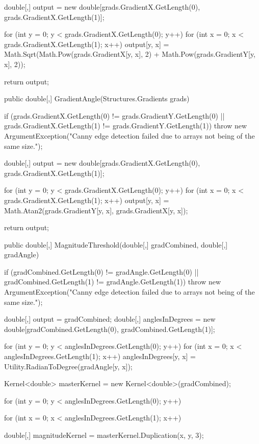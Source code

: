 \begin{flushleft}
\begin{cscode}
{{        double[,] output = new double[grads.GradientX.GetLength(0), grads.GradientX.GetLength(1)];

        for (int y = 0; y < grads.GradientX.GetLength(0); y++)
        {
            for (int x = 0; x < grads.GradientX.GetLength(1); x++)
            {
                output[y, x] = Math.Sqrt(Math.Pow(grads.GradientX[y, x], 2) + Math.Pow(grads.GradientY[y, x], 2));
            }
        }

        return output;
    }

    public double[,] GradientAngle(Structures.Gradients grads)
    {
        if (grads.GradientX.GetLength(0) != grads.GradientY.GetLength(0) || grads.GradientX.GetLength(1) != grads.GradientY.GetLength(1))
            throw new ArgumentException("Canny edge detection failed due to arrays not being of the same size.");

        double[,] output = new double[grads.GradientX.GetLength(0), grads.GradientX.GetLength(1)];

        for (int y = 0; y < grads.GradientX.GetLength(0); y++)
        {
            for (int x = 0; x < grads.GradientX.GetLength(1); x++)
            {
                output[y, x] = Math.Atan2(grads.GradientY[y, x], grads.GradientX[y, x]);
            }
        }

        return output;
    }

    public double[,] MagnitudeThreshold(double[,] gradCombined, double[,] gradAngle)
    {
        if (gradCombined.GetLength(0) != gradAngle.GetLength(0) || gradCombined.GetLength(1) != gradAngle.GetLength(1))
            throw new ArgumentException("Canny edge detection failed due to arrays not being of the same size.");

        double[,] output = gradCombined;
        double[,] anglesInDegrees = new double[gradCombined.GetLength(0), gradCombined.GetLength(1)];

        for (int y = 0; y < anglesInDegrees.GetLength(0); y++)
        {
            for (int x = 0; x < anglesInDegrees.GetLength(1); x++)
            {
                anglesInDegrees[y, x] = Utility.RadianToDegree(gradAngle[y, x]);
            }
        }

        Kernel<double> masterKernel = new Kernel<double>(gradCombined);

        for (int y = 0; y < anglesInDegrees.GetLength(0); y++)
        {
            for (int x = 0; x < anglesInDegrees.GetLength(1); x++)
            {
                double[,] magnitudeKernel = masterKernel.Duplication(x, y, 3);

}}}}
\end{cscode}
\end{flushleft}
